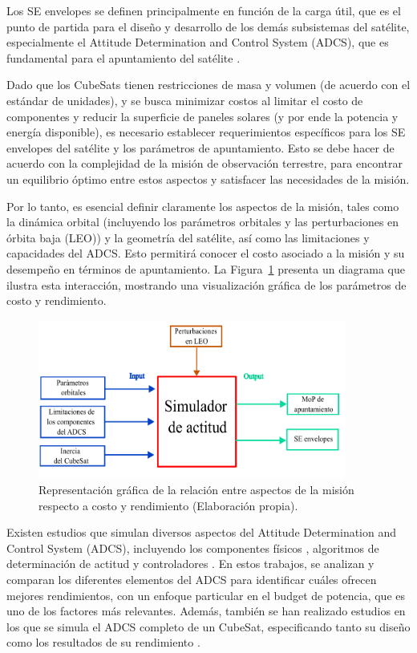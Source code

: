 Los SE envelopes se definen principalmente en función de la carga útil, que es el punto de partida para el diseño y desarrollo de los demás subsistemas del satélite, especialmente el Attitude Determination and Control System (ADCS), que es fundamental para el apuntamiento del satélite \cite{ref8}.

Dado que los CubeSats tienen restricciones de masa y volumen (de acuerdo con el estándar de unidades), y se busca minimizar costos al limitar el costo de componentes y reducir la superficie de paneles solares (y por ende la potencia y energía disponible), es necesario establecer requerimientos específicos para los SE envelopes del satélite y los parámetros de apuntamiento. Esto se debe hacer de acuerdo con la complejidad de la misión de observación terrestre, para encontrar un equilibrio óptimo entre estos aspectos y satisfacer las necesidades de la misión.

Por lo tanto, es esencial definir claramente los aspectos de la misión, tales como la dinámica orbital (incluyendo los parámetros orbitales y las perturbaciones en órbita baja (LEO)) y la geometría del satélite, así como las limitaciones y capacidades del ADCS. Esto permitirá conocer el costo asociado a la misión y su desempeño en términos de apuntamiento. La Figura~\ref{fig:bloques01} presenta un diagrama que ilustra esta interacción, mostrando una visualización gráfica de los parámetros de costo y rendimiento.

\begin{figure}[h]
	\centering    
	\includegraphics[width=0.9\textwidth]{diagrama memoria1234.pdf}
	\caption{Representación gráfica de la relación entre aspectos de la misión respecto a costo y rendimiento (Elaboración propia).}
	\label{fig:bloques01}
\end{figure}

Existen estudios que simulan diversos aspectos del Attitude Determination and Control System (ADCS), incluyendo los componentes físicos \cite{ref12}, algoritmos de determinación de actitud \cite{ref13} y controladores \cite{ref14}. En estos trabajos, se analizan y comparan los diferentes elementos del ADCS para identificar cuáles ofrecen mejores rendimientos, con un enfoque particular en el budget de potencia, que es uno de los factores más relevantes. Además, también se han realizado estudios en los que se simula el ADCS completo de un CubeSat, especificando tanto su diseño como los resultados de su rendimiento \cite{ref15,ref16,ref17}.

